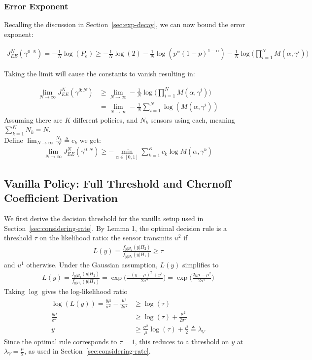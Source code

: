 \documentclass[11pt]{article}
\newcommand{\JNEE}{J^N_{EE}(\gamma^{0:N})}
\begin{document}
\subsubsection*{Error Exponent}
Recalling the discussion in Section~\ref{sec:exp-decay}, we can now bound the error exponent:

\begin{align}
    \JNEE  = -\frac{1}{N}\log(P_e) \geq -\frac{1}{N}\log(2) -\frac{1}{N}\log(p^\alpha (1-p)^{1-\alpha})-\frac{1}{N}\log\bigg( \prod_{i=1}^{N}M(\alpha,\gamma^i) \bigg)
\end{align}

Taking the limit will cause the constants to vanish resulting in:

\begin{align}
    \lim_{N \to \infty}\JNEE &\geq\lim_{N \to \infty} -\frac{1}{N}\log\bigg( \prod_{i=1}^{N}M(\alpha,\gamma^i) \bigg)\\
    &= \lim_{N \to \infty} -\frac{1}{N}\sum_{i=1}^{N} \log(M(\alpha,\gamma^i))
\end{align}
Assuming there are $K$ different policies, and $N_k$ sensors using each, meaning $\sum_{k=1}^{K}N_k = N$.\\
Define $\lim_{N \to \infty}\frac{N_k}{N} \triangleq c_k$ we get:
\begin{align}
    \lim_{N \to \infty}\JNEE \geq -\min_{\alpha \in [0,1]}\sum_{k=1}^{K} c_k \log M(\alpha,\gamma^k)
\end{align}

\subsection{Vanilla Policy: Full Threshold and Chernoff Coefficient Derivation}
\label{app:vanilla-derivation}
We first derive the decision threshold for the vanilla setup used in Section~\ref{sec:considering-rate}. By Lemma 1, the optimal decision rule is a threshold $\tau$ on the likelihood ratio: the sensor transmits $u^2$ if
\begin{align*}
    L(y) = \frac{f_{y|H_2}(y|H_2)}{f_{y|H_1}(y|H_1)} \geq \tau
\end{align*}
and $u^1$ otherwise. Under the Gaussian assumption, $L(y)$ simplifies to
\begin{align*}
    L(y) = \frac{f_{y|H_2}(y|H_2)}{f_{y|H_1}(y|H_1)} = \exp\bigg(\frac{-(y-\mu)^2 + y^2}{2\sigma^2}\bigg) = \exp\bigg(\frac{2y\mu-\mu^2}{2\sigma^2}\bigg)
\end{align*}
Taking $\log$ gives the log-likelihood ratio
\begin{align*}
    \log(L(y)) = \frac{y\mu}{\sigma^2} - \frac{\mu^2}{2\sigma^2} &\geq \log(\tau) \\
    \frac{y\mu}{\sigma^2} &\geq \log(\tau) + \frac{\mu^2}{2\sigma^2}\\
    y &\geq \frac{\sigma^2}{\mu}\log(\tau) + \frac{\mu}{2} \triangleq \lambda_V
\end{align*}
Since the optimal rule corresponds to $\tau = 1$, this reduces to a threshold on $y$ at $\lambda_V = \frac{\mu}{2}$, as used in Section~\ref{sec:considering-rate}.
\end{document}
